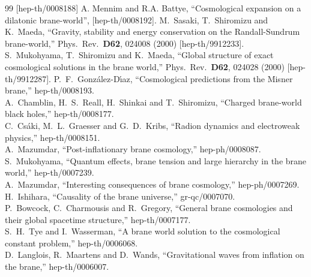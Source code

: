 \documentclass[a4paper,10pt]{article}
\begin{document}
\begin{thebibliography}{99}
[hep-th/0008188]
A. Mennim and R.A. Battye,
``Cosmological expansion on a dilatonic brane-world'',
[hep-th/0008192].
M.~Sasaki, T.~Shiromizu and K.~Maeda,
``Gravity, stability and energy conservation on the Randall-Sundrum  brane-world,''
Phys.\ Rev.\  {\bf D62}, 024008 (2000)
[hep-th/9912233].
\\
S.~Mukohyama, T.~Shiromizu and K.~Maeda,
``Global structure of exact cosmological solutions in the brane world,''
Phys.\ Rev.\  {\bf D62}, 024028 (2000)
[hep-th/9912287].
P.~F.~Gonz\'alez-D\'\i{}az,
``Cosmological predictions from the Misner brane,''
hep-th/0008193.
\\
A.~Chamblin, H.~S.~Reall, H.~Shinkai and T.~Shiromizu,
``Charged brane-world black holes,''
hep-th/0008177.
\\
C.~Cs\'aki, M.~L.~Graesser and G.~D.~Kribs,
``Radion dynamics and electroweak physics,''
hep-th/0008151.
\\
A.~Mazumdar,
``Post-inflationary brane cosmology,''
hep-ph/0008087.
\\
S.~Mukohyama,
``Quantum effects, brane tension and large hierarchy in the brane world,''
hep-th/0007239.
\\
A.~Mazumdar,
``Interesting consequences of brane cosmology,''
hep-ph/0007269.
\\
H.~Ishihara,
``Causality of the brane universe,''
gr-qc/0007070.
\\
P.~Bowcock, C.~Charmousis and R.~Gregory,
``General brane cosmologies and their global spacetime structure,''
hep-th/0007177.
\\
S.~H.~Tye and I.~Wasserman,
``A brane world solution to the cosmological constant problem,''
hep-th/0006068.
\\
D.~Langlois, R.~Maartens and D.~Wands,
``Gravitational waves from inflation on the brane,''
hep-th/0006007.
\\

\end{thebibliography}
\end{document}
